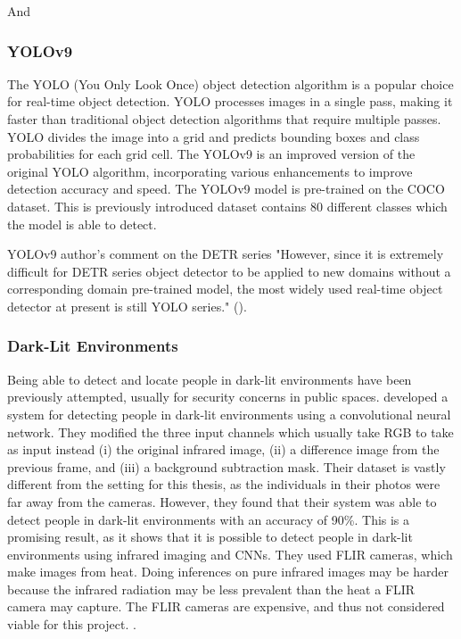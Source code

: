 And 

\subsubsection{YOLOv9}
\label{sec:yolov9}
The YOLO (You Only Look Once) object detection algorithm is a popular choice for real-time object detection. YOLO processes images in a single pass, making it faster than traditional object detection algorithms that require multiple passes. YOLO divides the image into a grid and predicts bounding boxes and class probabilities for each grid cell. The YOLOv9 is an improved version of the original YOLO algorithm, incorporating various enhancements to improve detection accuracy and speed. The YOLOv9 model is pre-trained on the COCO dataset. This is previously introduced dataset contains 80 different classes which the model is able to detect. 

\begin{myquote}{YOLOv9 author's comment on the DETR series}
    "However, since it is extremely difficult for DETR series object detector to be applied to new domains without a corresponding domain pre-trained model, the most widely used real-time object detector at present is still YOLO series." (\cite{wa2024yolov9}).
\end{myquote}



\subsubsection{Dark-Lit Environments}
Being able to detect and locate people in dark-lit environments have been previously attempted, usually for security concerns in public spaces. \citeauthor{pa2020PersonDetectionNightTimeFLIR} developed a system for detecting people in dark-lit environments using a convolutional neural network. They modified the three input channels which usually take RGB to take as input instead (i) the original infrared image, (ii) a difference image from the previous frame, and (iii) a background subtraction mask. Their dataset is vastly different from the setting for this thesis, as the individuals in their photos were far away from the cameras. However, they found that their system was able to detect people in dark-lit environments with an accuracy of 90\%. This is a promising result, as it shows that it is possible to detect people in dark-lit environments using infrared imaging and CNNs. They used FLIR cameras, which make images from heat. Doing inferences on pure infrared images may be harder because the infrared radiation may be less prevalent than the heat a FLIR camera may capture. The FLIR cameras are expensive, and thus not considered viable for this project.
\cite{pa2020PersonDetectionNightTimeFLIR}.


